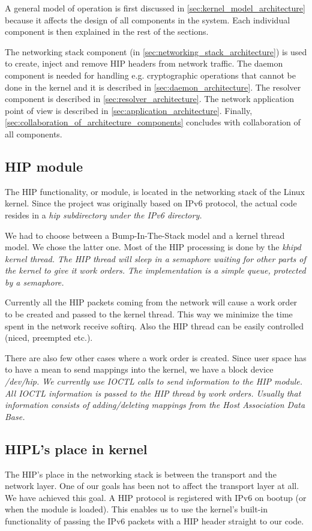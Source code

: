 A general model of operation is first discussed in
\autoref{sec:kernel_model_architecture} because it affects the design
of all components in the system. Each individual component is then
explained in the rest of the sections.

The networking stack component (in
\autoref{sec:networking_stack_architecture}) is used to create, inject
and remove HIP headers from network traffic. The daemon component is
needed for handling e.g. cryptographic operations that cannot be done
in the kernel and it is described in
\autoref{sec:daemon_architecture}. The resolver component is described
in \autoref{sec:resolver_architecture}. The network application point
of view is described in
\autoref{sec:application_architecture}. Finally,
\autoref{sec:collaboration_of_architecture_components} concludes with
collaboration of all components.

\subsection{HIP module}
\label{sec:kernel_model_architecture}

The HIP functionality, or module, is located in the networking stack of the
Linux kernel. Since the project was originally based on IPv6 protocol, the
actual code resides in a \em{hip} subdirectory under the IPv6 directory.

We had to choose between a Bump-In-The-Stack model and a kernel thread model. We
chose the latter one. Most of the HIP processing is done by the \em{khipd}
kernel thread. The HIP thread will sleep in a semaphore waiting for other parts
of the kernel to give it \em{work orders}. The implementation is a simple queue,
protected by a semaphore.

Currently all the HIP packets coming from the network will cause a work order to
be created and passed to the kernel thread. This way we minimize the time spent
in the network receive softirq. Also the HIP thread can be easily controlled
(niced, preempted etc.).

There are also few other cases where a work order is created. Since user space
has to have a mean to send mappings into the kernel, we have a block device \em{/dev/hip}.
We currently use IOCTL calls to send information to the HIP module. All IOCTL
information is passed to the HIP thread by work orders. Usually that information
consists of adding/deleting mappings from the Host Association Data Base.

\subsection{HIPL's place in kernel}
The HIP's place in the networking stack is between the transport and the network
layer. One of our goals has been not to affect the transport layer at all. We
have achieved this goal. A HIP protocol is registered with IPv6 on bootup (or
when the module is loaded). This enables us to use the kernel's built-in
functionality of passing the IPv6 packets with a HIP header straight to our
code.

